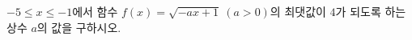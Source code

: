 \hspace*{2mm}\begin{minipage}[t]{\dimexpr\linewidth-2mm\relax}\vspace{0pt}
$-5\le x\le -1$에서 함수 $f(x)=\sqrt{-ax+1}\ (a>0)$의 최댓값이 $4$가 되도록 하는 상수 $a$의 값을 구하시오.\end{minipage}
